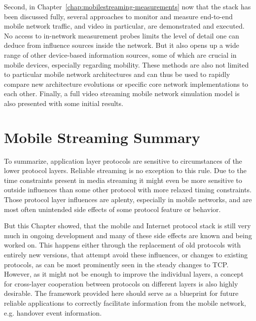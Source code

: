 Second, in Chapter~\ref{chap:mobilestreaming-measurements} now that the stack has been discussed fully, several approaches to monitor and measure end-to-end mobile network traffic, and video in particular, are demonstrated and executed. No access to in-network measurement probes limits the level of detail one can deduce from influence sources inside the network. But it also opens up a wide range of other device-based information sources, some of which are crucial in mobile devices, especially regarding mobility. These methods are also not limited to particular mobile network architectures and can thus be used to rapidly compare new architecture evolutions or specific core network implementations to each other. Finally, a full video streaming mobile network simulation model is also presented with some initial results.








\section{Mobile Streaming Summary}

To summarize, application layer protocols are sensitive to circumstances of the lower protocol layers. Reliable streaming is no exception to this rule. Due to the time constraints present in media streaming it might even be more sensitive to outside influences than some other protocol with more relaxed timing constraints. Those protocol layer influences are aplenty, especially in mobile networks, and are most often unintended side effects of some protocol feature or behavior.

But this Chapter showed, that the mobile and Internet protocol stack is still very much in ongoing development and many of these side effects are known and being worked on. This happens either through the replacement of old protocols with entirely new versions, that attempt avoid these influences, or changes to existing protocols, as can be most prominently seen in the steady changes to \gls{TCP}. However, as it might not be enough to improve the individual layers, a concept for cross-layer cooperation between protocols on different layers is also highly desirable. The framework provided here should serve as a blueprint for future reliable applications to correctly facilitate information from the mobile network, e.g. handover event information.


